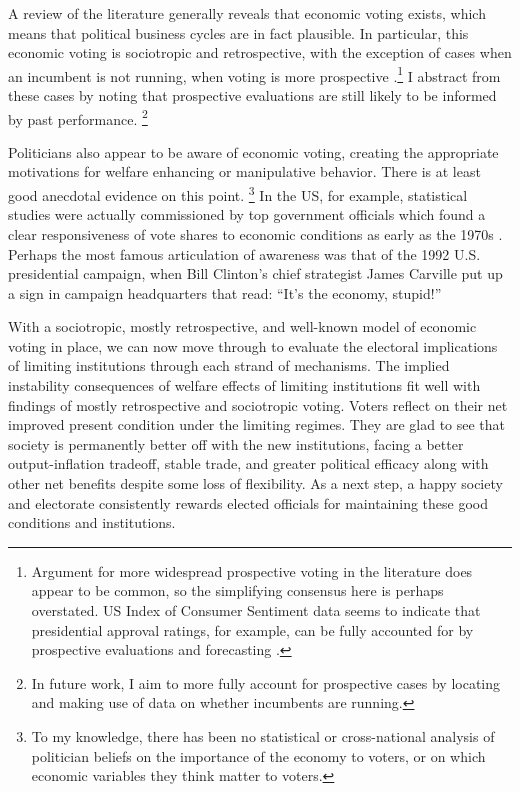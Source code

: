 \documentclass{article}
\begin{document}
    A review of the literature generally reveals that economic voting exists, which means that political business cycles are in fact plausible. In particular, this economic voting is sociotropic and retrospective, with the exception of cases when an incumbent is not running, when voting is more prospective \citep{lewis-beck_economic_2000,nadeau_national_2001}.\footnote{Argument for more widespread prospective voting in the literature does appear to be common, so the simplifying consensus here is perhaps overstated. US Index of Consumer Sentiment data seems to indicate that presidential approval ratings, for example, can be fully accounted for by prospective evaluations and forecasting \citep{mackuen_peasants_1992}.}  I abstract from these cases by noting that prospective evaluations are still likely to be informed by past performance. \footnote{In future work, I aim to more fully account for prospective cases by locating and making use of data on whether incumbents are running.}

    Politicians also appear to be aware of economic voting, creating the appropriate motivations for welfare enhancing or manipulative behavior. There is at least good anecdotal evidence on this point. \footnote{To my knowledge, there has been no statistical or cross-national analysis of politician beliefs on the importance of the economy to voters, or on which economic variables they think matter to voters.} In the US, for example, statistical studies were actually commissioned by top government officials which found a clear responsiveness of vote shares to economic conditions as early as the 1970s \citep{tufte_political_1980}. Perhaps the most famous articulation of awareness was that of the 1992 U.S. presidential campaign, when Bill Clinton’s chief strategist James Carville put up a sign in campaign headquarters that read: “It’s the economy, stupid!” \citep{anderson_end_2007}

    With a sociotropic, mostly retrospective, and well-known model of economic voting in place, we can now move through to evaluate the electoral implications of limiting institutions through each strand of mechanisms. The implied instability consequences of welfare effects of limiting institutions fit well with findings of mostly retrospective and sociotropic voting. Voters reflect on their net improved present condition under the limiting regimes. They are glad to see that society is permanently better off with the new institutions, facing a better output-inflation tradeoff, stable trade, and greater political efficacy along with other net benefits despite some loss of flexibility. As a next step, a happy society and electorate consistently rewards elected officials for maintaining these good conditions and institutions.
\end{document}
